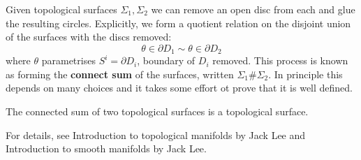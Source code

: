 \documentclass[a4paper]{article}
\begin{document}
\begin{example}
	Given topological surfaces \( \Sigma_1, \Sigma_2 \) we can remove an open disc from each and glue the resulting circles.
	Explicitly, we form a quotient relation on the disjoint union of the surfaces with the discs removed: 
	\[
		\theta\in \partial D_1 \sim \theta \in \partial D_2
	\]
	where $\theta$ parametrises $S^i=\partial D_i$, boundary of $D_i$ removed.
	This process is known as forming the \textbf{connect sum} of the surfaces, written \( \Sigma_1 \# \Sigma_2 \). In principle this depends on many choices and it takes some effort ot prove that it is well defined. 
	\begin{lemma}
		The connected sum of two topological surfaces is a topological surface.
	\end{lemma}
	For details, see Introduction to topological manifolds by Jack Lee and Introduction to smooth manifolds by Jack Lee. 
\end{example}
\end{document}

